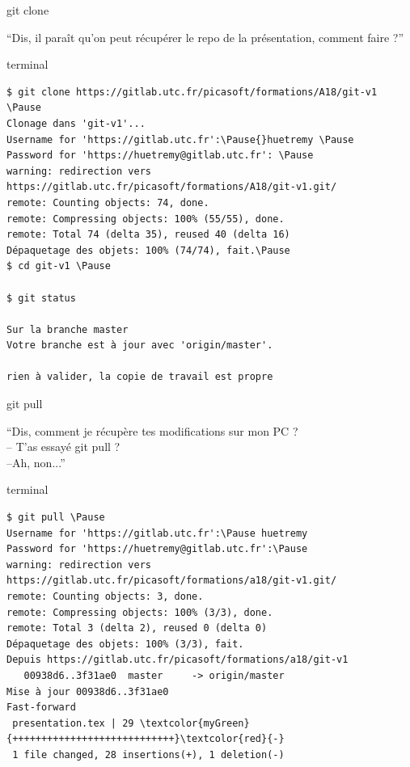 \documentclass[usepdftitle=false]{beamer}
\newcommand{\Pause}{%
\ifdef{\Release}
  {\pause}
  {}
}
\begin{document}
\begin{frame}[fragile]{git clone}
	\begin{block}{}
	\enquote{Dis, il paraît qu'on peut récupérer le repo de la présentation, comment faire ?}
	\end{block}
	\begin{beamercolorbox}[rounded=true,shadow=true]{terminal}
		\begin{Verbatim}
$ git clone https://gitlab.utc.fr/picasoft/formations/A18/git-v1 \Pause
Clonage dans 'git-v1'...
Username for 'https://gitlab.utc.fr':\Pause{}huetremy \Pause
Password for 'https://huetremy@gitlab.utc.fr': \Pause
warning: redirection vers https://gitlab.utc.fr/picasoft/formations/A18/git-v1.git/
remote: Counting objects: 74, done.
remote: Compressing objects: 100% (55/55), done.
remote: Total 74 (delta 35), reused 40 (delta 16)
Dépaquetage des objets: 100% (74/74), fait.\Pause
$ cd git-v1 \Pause

$ git status

Sur la branche master
Votre branche est à jour avec 'origin/master'.

rien à valider, la copie de travail est propre
		\end{Verbatim}
	\end{beamercolorbox}
\end{frame}

\begin{frame}[fragile]{git pull}
	\begin{block}{}
		\enquote{Dis, comment je récupère tes modifications sur mon PC ? \\ -- T'as essayé git pull ? \\ --Ah, non...}
	\end{block}
	\begin{beamercolorbox}[rounded=true,shadow=true]{terminal}
	\begin{Verbatim}
$ git pull \Pause
Username for 'https://gitlab.utc.fr':\Pause huetremy
Password for 'https://huetremy@gitlab.utc.fr':\Pause
warning: redirection vers https://gitlab.utc.fr/picasoft/formations/a18/git-v1.git/
remote: Counting objects: 3, done.
remote: Compressing objects: 100% (3/3), done.
remote: Total 3 (delta 2), reused 0 (delta 0)
Dépaquetage des objets: 100% (3/3), fait.
Depuis https://gitlab.utc.fr/picasoft/formations/a18/git-v1
   00938d6..3f31ae0  master     -> origin/master
Mise à jour 00938d6..3f31ae0
Fast-forward
 presentation.tex | 29 \textcolor{myGreen}{++++++++++++++++++++++++++++}\textcolor{red}{-}
 1 file changed, 28 insertions(+), 1 deletion(-)
	\end{Verbatim}
	\end{beamercolorbox}
\end{frame}
\end{document}
